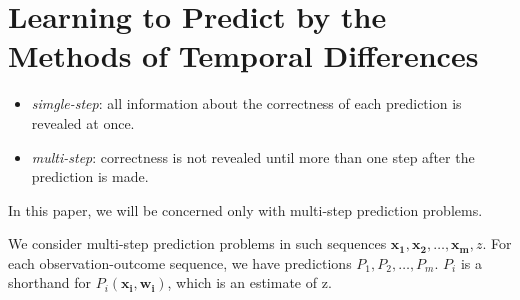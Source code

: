 
\section{Learning to Predict by the Methods of Temporal Differences\cite{Sutton1988}}

\begin{itemize}
	\item \emph{simgle-step}: all information about the correctness of each prediction is revealed at once.
	\item \emph{multi-step}: correctness is not revealed until more than one step after the prediction is made.
\end{itemize}

In this paper, we will be concerned only with multi-step prediction problems.

We consider multi-step prediction problems in such sequences
$ \mathbf{x_1}, \mathbf{x_2}, \dots, \mathbf{x_m}, z $. For each observation-outcome sequence, 
we have predictions
$ P_1, P_2, \dots, P_m $. $ P_i$ is a shorthand for $ P_i(\mathbf{x_i}, \mathbf{w_i}) $,
which is an estimate of z.

